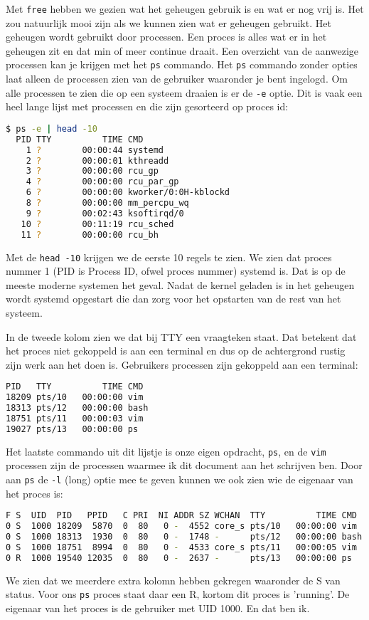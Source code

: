 Met \texttt{free} hebben we gezien wat het geheugen gebruik is en wat er nog vrij is. Het zou natuurlijk mooi zijn als we kunnen zien wat er geheugen gebruikt. Het geheugen wordt gebruikt door processen. Een proces is alles wat er in het geheugen zit en dat min of meer continue draait. Een overzicht van de aanwezige processen kan je krijgen met het \texttt{ps} commando. Het \texttt{ps} commando zonder opties laat alleen de processen zien van de gebruiker waaronder je bent ingelogd. Om alle processen te zien die op een systeem draaien is er de \texttt{-e} optie. Dit is vaak een heel lange lijst met processen en die zijn gesorteerd op proces id:
\begin{lstlisting}[language=bash]
$ ps -e | head -10
  PID TTY          TIME CMD
    1 ?        00:00:44 systemd
    2 ?        00:00:01 kthreadd
    3 ?        00:00:00 rcu_gp
    4 ?        00:00:00 rcu_par_gp
    6 ?        00:00:00 kworker/0:0H-kblockd
    8 ?        00:00:00 mm_percpu_wq
    9 ?        00:02:43 ksoftirqd/0
   10 ?        00:11:19 rcu_sched
   11 ?        00:00:00 rcu_bh
\end{lstlisting}
Met de \texttt{head -10} krijgen we de eerste 10 regels te zien. We zien dat proces nummer 1 (PID is Process ID, ofwel proces nummer) systemd is. Dat is op de meeste moderne systemen het geval. Nadat de kernel geladen is in het geheugen wordt systemd opgestart die dan zorg voor het opstarten van de rest van het systeem.

In de tweede kolom zien we dat bij TTY een vraagteken staat. Dat betekent dat het proces niet gekoppeld is aan een terminal en dus op de achtergrond rustig zijn werk aan het doen is. Gebruikers processen zijn gekoppeld aan een terminal:
\begin{lstlisting}[language=bash]
PID   TTY          TIME CMD
18209 pts/10   00:00:00 vim
18313 pts/12   00:00:00 bash
18751 pts/11   00:00:03 vim
19027 pts/13   00:00:00 ps
\end{lstlisting}
Het laatste commando uit dit lijstje is onze eigen opdracht, \texttt{ps}, en de \texttt{vim} processen zijn de processen waarmee ik dit document aan het schrijven ben. Door aan \texttt{ps} de \texttt{-l} (long) optie mee te geven kunnen we ook zien wie de eigenaar van het proces is:
\begin{lstlisting}[language=bash]
F S  UID  PID   PPID   C PRI  NI ADDR SZ WCHAN  TTY          TIME CMD
0 S  1000 18209  5870  0  80   0 -  4552 core_s pts/10   00:00:00 vim
0 S  1000 18313  1930  0  80   0 -  1748 -      pts/12   00:00:00 bash
0 S  1000 18751  8994  0  80   0 -  4533 core_s pts/11   00:00:05 vim
0 R  1000 19540 12035  0  80   0 -  2637 -      pts/13   00:00:00 ps
\end{lstlisting}
We zien dat we meerdere extra kolomn hebben gekregen waaronder de S van status. Voor ons \texttt{ps} proces staat daar een R, kortom dit proces is 'running'. De eigenaar van het proces is de gebruiker met UID 1000. En dat ben ik.

